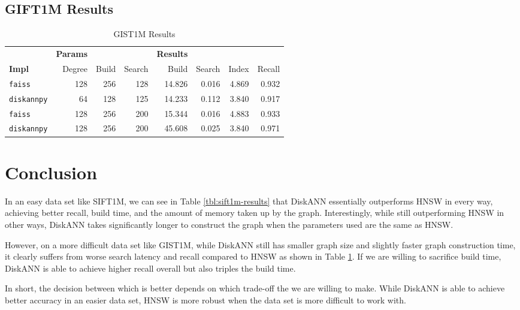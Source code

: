 \subsection{GIFT1M Results}

\begin{table}[ht]
    \centering
    \caption{GIST1M Results}
    \label{tbl:gist1m-results}
    \begin{tabular}{l|rrr|rrrr}
        \toprule
        & \textbf{Params} & & & \textbf{Results} & & \\
        \textbf{Impl} & Degree & Build & Search & Build & Search & Index & Recall \\
        \midrule
        \texttt{faiss} & 128 & 256 & 128 & 14.826 & 0.016 & 4.869 & 0.932 \\
        \texttt{diskannpy} & 64 & 128 & 125 & 14.233 & 0.112 & 3.840 & 0.917 \\
        \midrule
        \texttt{faiss} & 128 & 256 & 200 & 15.344 & 0.016 & 4.883 & 0.933 \\
        \texttt{diskannpy} & 128 & 256 & 200 & 45.608 & 0.025 & 3.840 & 0.971 \\
        \bottomrule
    \end{tabular}
\end{table}


\section{Conclusion}

In an easy data set like SIFT1M, we can see in Table \ref{tbl:sift1m-results} that DiskANN essentially outperforms HNSW in every way, achieving better recall, build time, and the amount of memory taken up by the graph. Interestingly, while still outperforming HNSW in other ways, DiskANN takes significantly longer to construct the graph when the parameters used are the same as HNSW.

However, on a more difficult data set like GIST1M, while DiskANN still has smaller graph size and slightly faster graph construction time, it clearly suffers from worse search latency and recall compared to HNSW as shown in Table \ref{tbl:gist1m-results}. If we are willing to sacrifice build time, DiskANN is able to achieve higher recall overall but also triples the build time.

In short, the decision between which is better depends on which trade-off the we are willing to make. While DiskANN is able to achieve better accuracy in an easier data set, HNSW is more robust when the data set is more difficult to work with.
